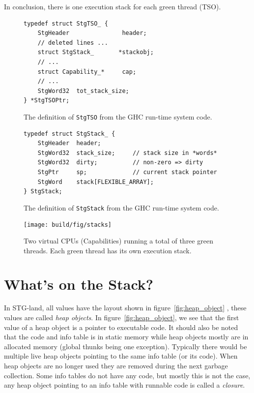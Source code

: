In conclusion, there is one execution stack for each green thread (TSO).

\begin{figure}
\begin{mdframed}
  \begin{verbatim}
typedef struct StgTSO_ {
    StgHeader               header;
    // deleted lines ...
    struct StgStack_       *stackobj;
    // ...
    struct Capability_*     cap;
    // ...
    StgWord32  tot_stack_size;
} *StgTSOPtr;
  \end{verbatim}
  \caption{The definition of \texttt{StgTSO} from the GHC run-time system
    code.}
  \label{fig:tso_definition}
\end{mdframed}
\end{figure}

\begin{figure}
\begin{mdframed}
  \begin{verbatim}
typedef struct StgStack_ {
    StgHeader  header;
    StgWord32  stack_size;     // stack size in *words*
    StgWord32  dirty;          // non-zero => dirty
    StgPtr     sp;             // current stack pointer
    StgWord    stack[FLEXIBLE_ARRAY];
} StgStack;
  \end{verbatim}
  \caption{The definition of \texttt{StgStack} from the GHC run-time system
    code.}
  \label{fig:stack_definition}
\end{mdframed}
\end{figure}

\begin{figure}
\begin{mdframed}
  \centering
  \texttt{[image: build/fig/stacks]}
  \caption{Two virtual CPUs (Capabilities) running a total of three
green threads. Each green thread has its own execution stack.}
  \label{fig:stacks}
\end{mdframed}
\end{figure}

\section{What's on the Stack?} \label{sec:whats_on_the_stack}

In STG-land, all values have the layout shown in figure~\ref{fig:heap_object} \cite{commentary_heap_objects}, these values are
called \emph{heap objects}. In figure~\ref{fig:heap_object}, we see that
the first value of a heap object is a pointer to executable code. It
should also be noted that the code and info table is in static memory
while heap objects mostly are in allocated memory (global thunks being
one exception). Typically there would be multiple live heap objects
pointing to the same info table (or its code). When heap objects are no
longer used they are removed during the next garbage collection. Some
info tables do not have any code, but mostly this is not the case, any
heap object pointing to an info table with runnable code is called a
\emph{closure}.

